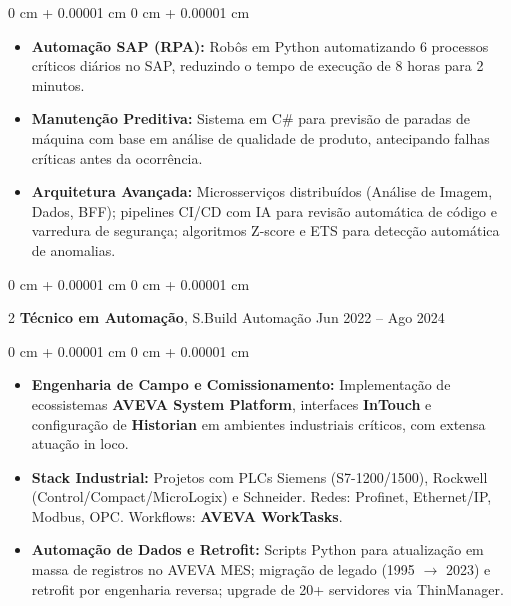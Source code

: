 \documentclass[10pt, letterpaper]{article}
\newenvironment{highlights}{ \begin{itemize}[ topsep=0.10 cm, parsep=0.10 cm, partopsep=0pt,
itemsep=0pt, leftmargin=0 cm + 10pt ] }{ \end{itemize} } %
\newenvironment{onecolentry}{ \begin{adjustwidth}{ 0 cm + 0.00001 cm }{ 0 cm + 0.00001 cm }
}{ \end{adjustwidth} } %
\newenvironment{twocolentry}[2][]{ \onecolentry \def\secondColumn{#2} \setcolumnwidth{\fill, 4.5 cm}
\begin{paracol}{2} }{ \switchcolumn \raggedleft \secondColumn \end{paracol}
\endonecolentry } %
\begin{document}
	\vspace{0.10 cm}
	\begin{onecolentry}
		\begin{highlights}
			\item \textbf{Automa\c{c}\~ao SAP (RPA):} Rob\^os em Python automatizando 6 processos cr\'iticos di\'arios no SAP, reduzindo o tempo de execu\c{c}\~ao de 8 horas para 2 minutos.
			\item \textbf{Manuten\c{c}\~ao Preditiva:} Sistema em C\# para previs\~ao de paradas de m\'aquina com base em an\'alise de qualidade de produto, antecipando falhas cr\'iticas antes da ocorr\^encia.
            \item \textbf{Arquitetura Avan\c{c}ada:} Microsservi\c{c}os distribu\'idos (An\'alise de Imagem, Dados, BFF); pipelines CI/CD com IA para revis\~ao autom\'atica de c\'odigo e varredura de seguran\c{c}a; algoritmos Z-score e ETS para detec\c{c}\~ao autom\'atica de anomalias.
		\end{highlights}
	\end{onecolentry}

	\vspace{0.2 cm}

	\begin{twocolentry}
		{ Jun 2022 -- Ago 2024 } \textbf{T\'ecnico em Automa\c{c}\~ao}, S.Build Automa\c{c}\~ao
	\end{twocolentry}

	\vspace{0.10 cm}
	\begin{onecolentry}
		\begin{highlights}
			\item \textbf{Engenharia de Campo e Comissionamento:} Implementa\c{c}\~ao de ecossistemas \textbf{AVEVA System Platform}, interfaces \textbf{InTouch} e configura\c{c}\~ao de \textbf{Historian} em ambientes industriais cr\'iticos, com extensa atua\c{c}\~ao in loco.
            \item \textbf{Stack Industrial:} Projetos com PLCs Siemens (S7-1200/1500), Rockwell (Control/Compact/MicroLogix) e Schneider. Redes: Profinet, Ethernet/IP, Modbus, OPC. Workflows: \textbf{AVEVA WorkTasks}.
            \item \textbf{Automa\c{c}\~ao de Dados e Retrofit:} Scripts Python para atualiza\c{c}\~ao em massa de registros no AVEVA MES; migra\c{c}\~ao de legado (1995 $\rightarrow$ 2023) e retrofit por engenharia reversa; upgrade de 20+ servidores via ThinManager.
		\end{highlights}
	\end{onecolentry}
\end{document}
